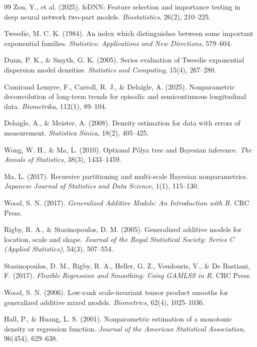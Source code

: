 \begin{thebibliography}{99}
Zou, Y., et al. (2025). fsDNN: Feature selection and importance testing in deep neural network two-part models. \emph{Biostatistics}, 26(2), 210--225.

Tweedie, M. C. K. (1984). An index which distinguishes between some important exponential families. \emph{Statistics: Applications and New Directions}, 579--604.

Dunn, P. K., \& Smyth, G. K. (2005). Series evaluation of Tweedie exponential dispersion model densities. \emph{Statistics and Computing}, 15(4), 267--280.

Camirand Lemyre, F., Carroll, R. J., \& Delaigle, A. (2025). Nonparametric deconvolution of long-term trends for episodic and semicontinuous longitudinal data. \emph{Biometrika}, 112(1), 89--104.

Delaigle, A., \& Meister, A. (2008). Density estimation for data with errors of measurement. \emph{Statistica Sinica}, 18(2), 405--425.

Wong, W. H., \& Ma, L. (2010). Optional Pólya tree and Bayesian inference. \emph{The Annals of Statistics}, 38(3), 1433--1459.

Ma, L. (2017). Recursive partitioning and multi-scale Bayesian nonparametrics. \emph{Japanese Journal of Statistics and Data Science}, 1(1), 115--130.

Wood, S. N. (2017). \emph{Generalized Additive Models: An Introduction with R}. CRC Press.

Rigby, R. A., \& Stasinopoulos, D. M. (2005). Generalized additive models for location, scale and shape. \emph{Journal of the Royal Statistical Society: Series C (Applied Statistics)}, 54(3), 507--554.

Stasinopoulos, D. M., Rigby, R. A., Heller, G. Z., Voudouris, V., \& De Bastiani, F. (2017). \emph{Flexible Regression and Smoothing: Using GAMLSS in R}. CRC Press.

Wood, S. N. (2006). Low-rank scale-invariant tensor product smooths for generalized additive mixed models. \emph{Biometrics}, 62(4), 1025--1036.

Hall, P., \& Huang, L. S. (2001). Nonparametric estimation of a monotonic density or regression function. \emph{Journal of the American Statistical Association}, 96(454), 629--638.


\end{thebibliography}
